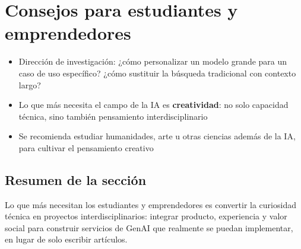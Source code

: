\section{Consejos para estudiantes y emprendedores}

\begin{itemize}
    \item Dirección de investigación: ¿cómo personalizar un modelo grande para un caso de uso específico? ¿cómo sustituir la búsqueda tradicional con contexto largo?
    \item Lo que más necesita el campo de la IA es \textbf{creatividad}: no solo capacidad técnica, sino también pensamiento interdisciplinario
    \item Se recomienda estudiar humanidades, arte u otras ciencias además de la IA, para cultivar el pensamiento creativo
\end{itemize}

\subsection{Resumen de la sección}

Lo que más necesitan los estudiantes y emprendedores es convertir la curiosidad técnica en proyectos interdisciplinarios: integrar producto, experiencia y valor social para construir servicios de GenAI que realmente se puedan implementar, en lugar de solo escribir artículos.

